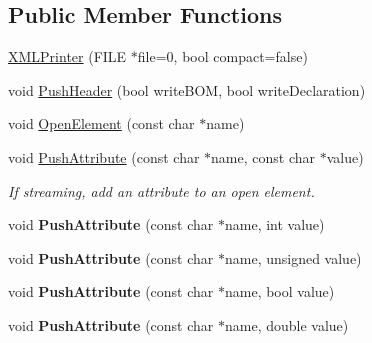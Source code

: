 \subsection*{Public Member Functions}
\begin{DoxyCompactItemize}
\item 
\hyperlink{classtinyxml2_1_1XMLPrinter_ad1eb8de568ceac1429cf04c66a349bd6}{X\+M\+L\+Printer} (F\+I\+LE $\ast$file=0, bool compact=false)
\item 
void \hyperlink{classtinyxml2_1_1XMLPrinter_a178c608ce8476043d5d6513819cde903}{Push\+Header} (bool write\+B\+OM, bool write\+Declaration)
\item 
void \hyperlink{classtinyxml2_1_1XMLPrinter_aa10d330818dbc31b44e9ffc27618bdfb}{Open\+Element} (const char $\ast$name)
\item 
\mbox{\label{classtinyxml2_1_1XMLPrinter_a9a4e2c9348b42e147629d5a99f4af3f0}} 
void \hyperlink{classtinyxml2_1_1XMLPrinter_a9a4e2c9348b42e147629d5a99f4af3f0}{Push\+Attribute} (const char $\ast$name, const char $\ast$value)
\begin{DoxyCompactList}\small\item\em If streaming, add an attribute to an open element. \end{DoxyCompactList}\item 
\mbox{\label{classtinyxml2_1_1XMLPrinter_a69120c82088597372d28d0a98f2ee7a1}} 
void {\bfseries Push\+Attribute} (const char $\ast$name, int value)
\item 
\mbox{\label{classtinyxml2_1_1XMLPrinter_aa41039e51990aaf5342f3e0575a692c4}} 
void {\bfseries Push\+Attribute} (const char $\ast$name, unsigned value)
\item 
\mbox{\label{classtinyxml2_1_1XMLPrinter_a51f7950d7b7a19f0d3a0d549a318d45f}} 
void {\bfseries Push\+Attribute} (const char $\ast$name, bool value)
\item 
\mbox{\label{classtinyxml2_1_1XMLPrinter_a1714867af40e68ca404c3e84b6cac2a6}} 
void {\bfseries Push\+Attribute} (const char $\ast$name, double value)
\item 
\mbox{\label{classtinyxml2_1_1XMLPrinter_aed6cce4bd414a78b3e2a824803c3ec42}} 

\end{DoxyCompactItemize}
